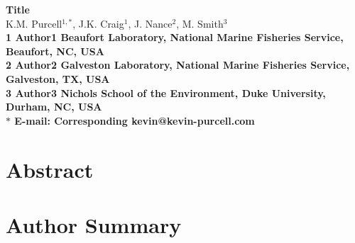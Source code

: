 \documentclass[10pt]{article}
\date{}
\begin{document}
\begin{flushleft}
{\Large
\textbf{Title}
}
\\
K.M. Purcell$^{1,\ast}$, 
J.K. Craig$^{1}$, 
J. Nance$^{2}$,
M. Smith$^{3}$
\\
\bf{1} Author1 Beaufort Laboratory, National Marine Fisheries Service, Beaufort, NC, USA
\\
\bf{2} Author2 Galveston Laboratory, National Marine Fisheries Service, Galveston, TX, USA
\\
\bf{3} Author3 Nichols School of the Environment, Duke University, Durham, NC, USA
\\
$\ast$ E-mail: Corresponding kevin@kevin-purcell.com
\end{flushleft}

\section*{Abstract}

\section*{Author Summary}
\end{document}
